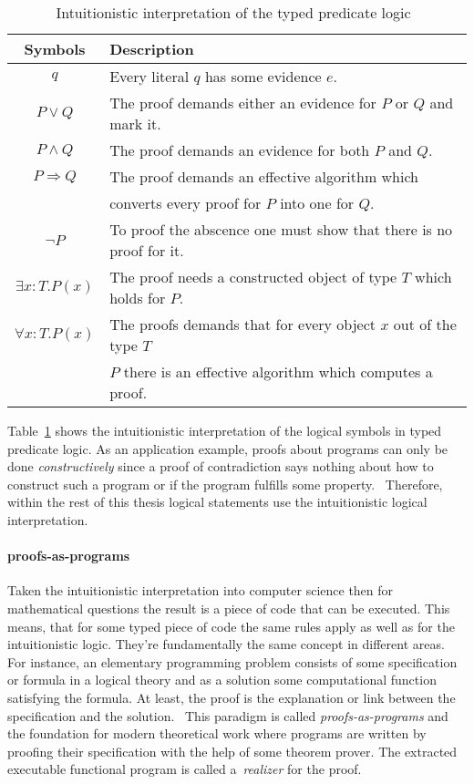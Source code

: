 \begin{table}[h]
  \centering
  \begin{tabular}{c|l}
    Symbols &  Description\\\hline
    $q$ & Every literal $q$ has some evidence $e$.\\
    $P\vee Q$ & The proof demands either an evidence for $P$ or $Q$ and mark it.\\
    $P\wedge Q$ & The proof demands an evidence for both $P$ and $Q$.\\
    $P\Rightarrow Q$ & The proof demands an effective algorithm which\\
           & converts every proof for $P$ into one for $Q$.\\
    $\neg P$ & To proof the abscence one must show that there is no proof for it.\\
    $\exists x:T.P(x)$ & The proof needs a constructed object of type $T$ which holds for $P$.\\
    $\forall x:T.P(x)$ & The proofs demands that for every object $x$ out of the type $T$\\
                 &  $P$ there is an effective algorithm which computes a proof.
  \end{tabular}
  \caption{Intuitionistic interpretation of the typed predicate logic~\cite{sep-mathematics-constructive}}
  \label{tab:intsymbols}
\end{table}

Table~\ref{tab:intsymbols} shows the intuitionistic interpretation of the logical
symbols in typed predicate logic. As an application example, proofs about
programs can only be done \textit{constructively} since a proof of contradiction
says nothing about how to construct such a program or if the program
fulfills some property.~\cite{kreitz1994automatisierte}
Therefore, within the rest of this thesis logical
statements use the intuitionistic logical interpretation.

\paragraph{proofs-as-programs}
Taken the intuitionistic interpretation into computer science then for
mathematical questions the result is a piece of code that can be
executed. This means, that for some typed piece of code the same
rules apply as well as for the intuitionistic logic. They're
fundamentally the same concept in different areas.
For instance, an elementary programming problem consists of
some specification or formula in a logical theory and as a solution
some computational function satisfying the formula. At least, the
proof is the explanation or link between the specification and the
solution.~\cite{bates1985proofs}
This paradigm is called \textit{proofs-as-programs} and the foundation
for modern theoretical work where programs are written by proofing their
specification with the help of some theorem prover. The extracted executable
functional program is called a~\textit{realizer} for the proof.

